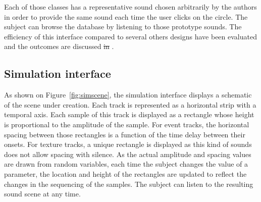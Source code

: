\documentclass[12pt]{elsarticle}
\newcommand{\cf}{cf.}
\providecommand{\DIFadd}[1]{{\protect\color{blue}\uwave{#1}}} %
\providecommand{\DIFdel}[1]{{\protect\color{red}\sout{#1}}}                      %
\providecommand{\DIFaddbegin}{} %
\providecommand{\DIFaddend}{} %
\providecommand{\DIFdelbegin}{} %
\providecommand{\DIFdelend}{} %
\begin{document}
Each of those classes has a representative sound chosen arbitrarily by the authors in order to provide the same sound each time the user clicks on the circle. The subject can browse the database by listening to those prototype sounds. The efficiency of this interface compared to several others designs have been evaluated and the outcomes are discussed \DIFdelbegin \DIFdel{in }\DIFdelend \DIFaddbegin \DIFadd{by~}\DIFaddend \cite{lafay2016JAES}.

\subsection{Simulation interface}


As shown on Figure~\ref{fig:simscene}, the simulation interface displays a schematic of the scene under creation. Each track is represented as a horizontal strip with a temporal axis. Each sample of this track is displayed as a rectangle whose height is proportional to the amplitude of the sample. For event tracks, the horizontal spacing between those rectangles is a function of the time delay between their onsets. For texture tracks, a unique rectangle is displayed as this kind of sounds does not allow spacing with silence. As the actual amplitude and spacing values are drawn from random variables, each time the subject changes the value of a parameter, the location and height of the rectangles are updated to reflect the changes in the sequencing of the samples. The subject can listen to the resulting sound scene at any time.

\end{document}
